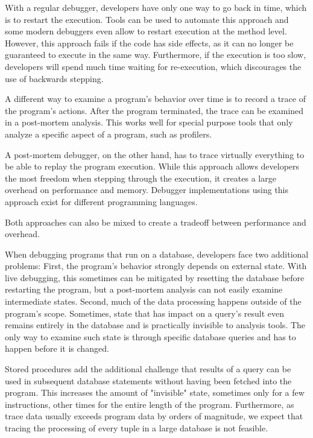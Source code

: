 \documentclass[english]{sig-alternate-05-2015}
\newcommand{\todo}[2][]{\pdfmargincomment[author={#1}]{#2}}
\begin{document}
With a regular debugger, developers have only one way to go back in time, which is to restart the execution.
Tools can be used to automate this approach\todo{cite} and some modern debuggers even allow to restart execution at the method level\todo{cite}.
However, this approach fails if the code has side effects, as it can no longer be guaranteed to execute in the same way.
Furthermore, if the execution is too slow, developers will spend much time waiting for re-execution, which discourages the use of backwards stepping.

A different way to examine a program's behavior over time is to record a trace of the program's actions.
After the program terminated, the trace can be examined in a post-mortem analysis.
This works well for special purpose tools that only analyze a specific aspect of a program, such as profilers.

A post-mortem debugger, on the other hand, has to trace virtually everything to be able to replay the program execution.
While this approach allows developers the most freedom when stepping through the execution, it creates a large overhead on performance and memory.
Debugger implementations using this approach exist for different programming languages.

Both approaches can also be mixed to create a tradeoff between performance and overhead\todo{cite}.

When debugging programs that run on a database, developers face two additional problems:
First, the program's behavior strongly depends on external state.
With live debugging, this sometimes can be mitigated by resetting the database before restarting the program, but a post-mortem analysis can not easily examine intermediate states.
Second, much of the data processing happens outside of the program's scope.
Sometimes, state that has impact on a query's result even remains entirely in the database and is practically invisible to analysis tools.
The only way to examine such state is through specific database queries and has to happen before it is changed.

Stored procedures add the additional challenge that results of a query can be used in subsequent database statements without having been fetched into the program.
This increases the amount of "invisible" state, sometimes only for a few instructions, other times for the entire length of the program.
Furthermore, as trace data usually exceeds program data by orders of magnitude, we expect that tracing the processing of every tuple in a large database is not feasible.
\end{document}
